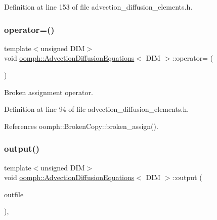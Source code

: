 Definition at line 153 of file advection\+\_\+diffusion\+\_\+elements.\+h.

\mbox{\label{classoomph_1_1AdvectionDiffusionEquations_aa80b72531531a916f3b0691b679d5b2a}} 
\subsubsection{\texorpdfstring{operator=()}{operator=()}}
{\footnotesize\ttfamily template$<$unsigned D\+IM$>$ \\
void \hyperlink{classoomph_1_1AdvectionDiffusionEquations}{oomph\+::\+Advection\+Diffusion\+Equations}$<$ D\+IM $>$\+::operator= (\begin{DoxyParamCaption}\item[{const \hyperlink{classoomph_1_1AdvectionDiffusionEquations}{Advection\+Diffusion\+Equations}$<$ D\+IM $>$ \&}]{ }\end{DoxyParamCaption})\hspace{0.3cm}{\ttfamily [inline]}}



Broken assignment operator. 



Definition at line 94 of file advection\+\_\+diffusion\+\_\+elements.\+h.



References oomph\+::\+Broken\+Copy\+::broken\+\_\+assign().

\mbox{\label{classoomph_1_1AdvectionDiffusionEquations_a3016c7a56e7f7178b4d9ae8604d0c10b}} 
\subsubsection{\texorpdfstring{output()}{output()}\hspace{0.1cm}{\footnotesize\ttfamily [1/4]}}
{\footnotesize\ttfamily template$<$unsigned D\+IM$>$ \\
void \hyperlink{classoomph_1_1AdvectionDiffusionEquations}{oomph\+::\+Advection\+Diffusion\+Equations}$<$ D\+IM $>$\+::output (\begin{DoxyParamCaption}\item[{std\+::ostream \&}]{outfile }\end{DoxyParamCaption})\hspace{0.3cm}{\ttfamily [inline]}, {\ttfamily [virtual]}}



